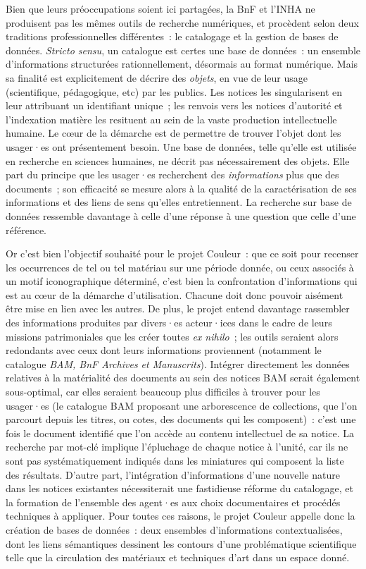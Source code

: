 \documentclass[a4paper,12pt, twoside]{book}
\begin{document}
Bien que leurs préoccupations soient ici partagées, la BnF et l’INHA ne produisent pas les mêmes outils de recherche numériques, et procèdent selon deux traditions professionnelles différentes~: le catalogage et la gestion de bases de données. \textit{Stricto sensu}, un catalogue est certes une base de données~: un ensemble d’informations structurées rationnellement, désormais au format numérique. Mais sa finalité est explicitement de décrire des \textit{objets}, en vue de leur usage (scientifique, pédagogique, etc) par les publics. Les notices les singularisent en leur attribuant un identifiant unique~; les renvois vers les notices d’autorité et l’indexation matière les resituent au sein de la vaste production intellectuelle humaine. Le cœur de la démarche est de permettre de trouver l’objet dont les usager·es ont présentement besoin. Une base de données, telle qu’elle est utilisée en recherche en sciences humaines, ne décrit pas nécessairement des objets. Elle part du principe que les usager·es recherchent des \textit{informations} plus que des documents~; son efficacité se mesure alors à la qualité de la caractérisation de ses informations et des liens de sens qu’elles entretiennent. La recherche sur base de données ressemble davantage à celle d’une réponse à une question que celle d’une référence.

Or c’est bien l’objectif souhaité pour le projet Couleur~: que ce soit pour recenser les occurrences de tel ou tel matériau sur une période donnée, ou ceux associés à un motif iconographique déterminé, c’est bien la confrontation d’informations qui est au cœur de la démarche d’utilisation. Chacune doit donc pouvoir aisément être mise en lien avec les autres. De plus, le projet entend davantage rassembler des informations produites par divers·es acteur·ices dans le cadre de leurs missions patrimoniales que les créer toutes \textit{ex nihilo}~; les outils seraient alors redondants avec ceux dont leurs informations proviennent (notamment le catalogue \emph{BAM, BnF Archives et Manuscrits}). Intégrer directement les données relatives à la matérialité des documents au sein des notices BAM serait également sous-optimal, car elles seraient beaucoup plus difficiles à trouver pour les usager·es (le catalogue BAM proposant une arborescence de collections, que l’on parcourt depuis les titres, ou cotes, des documents qui les composent)~: c’est une fois le document identifié que l’on accède au contenu intellectuel de sa notice. La recherche par mot-clé implique l’épluchage de chaque notice à l’unité, car ils ne sont pas systématiquement indiqués dans les miniatures qui composent la liste des résultats. D’autre part, l’intégration d’informations d’une nouvelle nature dans les notices existantes nécessiterait une fastidieuse réforme du catalogage, et la formation de l’ensemble des agent·es aux choix documentaires et procédés techniques à appliquer. Pour toutes ces raisons, le projet Couleur appelle donc la création de bases de données~: deux ensembles d’informations contextualisées, dont les liens sémantiques dessinent les contours d’une problématique scientifique telle que la circulation des matériaux et techniques d’art dans un espace donné.
\end{document}
